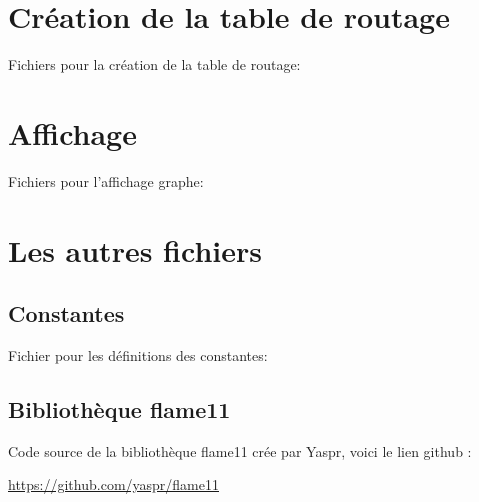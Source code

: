 \documentclass[a4paper,11pt]{report}
\begin{document}
\section{Création de la table de routage}
Fichiers pour la création de la table de routage:



\section{Affichage}
Fichiers pour l'affichage graphe:





\section{Les autres fichiers}
\subsection{Constantes}
Fichier pour les définitions des constantes:


\subsection{Bibliothèque flame11}
Code source de la bibliothèque flame11 crée par Yaspr, voici le lien github :
\begin{center}
    \url{https://github.com/yaspr/flame11}    
\end{center}



\end{document}
